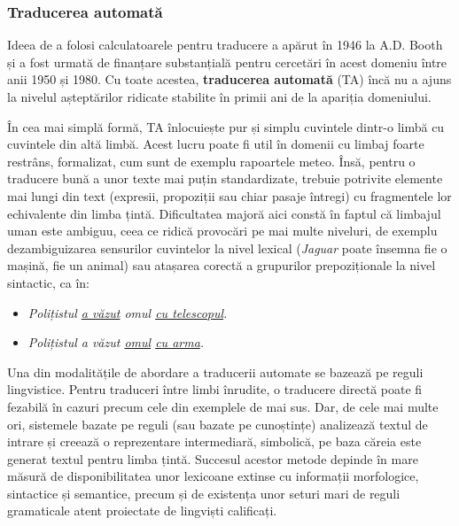 \begin{multicols}{2}
\subsubsection{Traducerea automată}

Ideea de a folosi calculatoarele pentru traducere a apărut în 1946 la A.D. Booth și a fost urmată de finanțare substanțială pentru cercetări în acest domeniu între anii 1950 și 1980. Cu toate acestea, \textbf{traducerea automată} (TA) încă nu a ajuns la nivelul așteptărilor ridicate stabilite în primii ani de la apariția domeniului.


În cea mai simplă formă, TA înlocuiește pur și simplu cuvintele dintr-o limbă cu cuvintele din altă limbă. Acest lucru poate fi util în domenii cu limbaj foarte restrâns, formalizat, cum sunt de exemplu rapoartele meteo. Însă, pentru o traducere bună a unor texte mai puțin standardizate, trebuie potrivite elemente mai lungi din text (expresii, propoziții sau chiar pasaje întregi) cu fragmentele lor echivalente din limba țintă. Dificultatea majoră aici constă în faptul că limbajul uman este ambiguu, ceea ce ridică provocări pe mai multe niveluri, de exemplu dezambiguizarea sensurilor cuvintelor la nivel lexical (\textit{Jaguar} poate însemna fie o mașină, fie un animal) sau atașarea corectă a grupurilor prepoziționale la nivel sintactic, ca în:

\begin{itemize}
\item \textit{Polițistul \underline{a văzut} omul \underline{cu telescopul}.}
\item \textit{Polițistul a văzut \underline{omul} \underline{cu arma}.}
\end{itemize}

Una din modalitățile de abordare a traducerii automate se bazează pe reguli lingvistice. Pentru traduceri între limbi înrudite, o traducere directă poate fi fezabilă în cazuri precum cele din exemplele de mai sus. Dar, de cele mai multe ori, sistemele bazate pe reguli (sau bazate pe cunoștințe) analizează textul de intrare și creează o reprezentare intermediară, simbolică, pe baza căreia este generat textul pentru limba țintă. Succesul acestor metode depinde în mare măsură de disponibilitatea unor lexicoane extinse cu informații morfologice, sintactice și semantice, precum și de existența unor seturi mari de reguli gramaticale atent proiectate de lingviști calificați.


\end{multicols}
